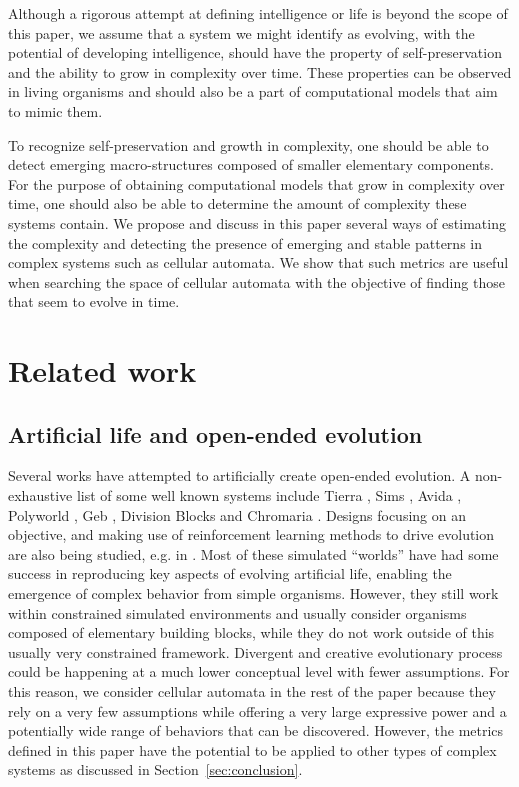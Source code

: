 Although a rigorous attempt at defining intelligence or life is beyond the scope
of this paper, we assume that a system we might identify as evolving, with the
potential of developing intelligence, should have the property of
self-preservation and the ability to grow in complexity over time. These
properties can be observed in living organisms
\parencite{bookerPerspectivesAdaptationNatural2004} and should also be a part of
computational models that aim to mimic them.

To recognize self-preservation and growth in complexity, one should be able to
detect emerging macro-structures composed of smaller elementary components. For
the purpose of obtaining computational models that grow in complexity over time,
one should also be able to determine the amount of complexity these systems
contain. We propose and discuss in this paper several ways of estimating the
complexity and detecting the presence of emerging and stable patterns in complex
systems such as cellular automata. We show that such metrics are useful when
searching the space of cellular automata with the objective of finding those
that seem to evolve in time.

\section{Related work}

\subsection{Artificial life and open-ended evolution}

Several works have attempted to artificially create open-ended evolution. A
non-exhaustive list of some well known systems include Tierra
\parencite{srayApproachSynthesisLife1991}, Sims
\parencite{simsEvolvingVirtualCreatures1994}, Avida
\parencite{ofriaAvidaSoftwarePlatform2004}, Polyworld
\parencite{yaegerComputationalGeneticsPhysiology1994}, Geb
\parencite{channonImprovingStillPassing2003}, Division Blocks
\parencite{spectorDivisionBlocksOpenended2007} and Chromaria
\parencite{sorosIdentifyingNecessaryConditions2014}. Designs focusing on an
objective, and making use of reinforcement learning methods to drive evolution
are also being studied, e.g. in
\parencite{pathakLearningControlSelfAssembling2019}. Most of these simulated
``worlds'' have had some success in reproducing key aspects of evolving
artificial life, enabling the emergence of complex behavior from simple
organisms. However, they still work within constrained simulated environments
and usually consider organisms composed of elementary building blocks, while
they do not work outside of this usually very constrained framework. Divergent
and creative evolutionary process could be happening at a much lower conceptual
level with fewer assumptions. For this reason, we consider cellular automata in
the rest of the paper because they rely on a very few assumptions while offering
a very large expressive power and a potentially wide range of behaviors that can
be discovered. However, the metrics defined in this paper have the potential to
be applied to other types of complex systems as discussed in
Section~\ref{sec:conclusion}.

